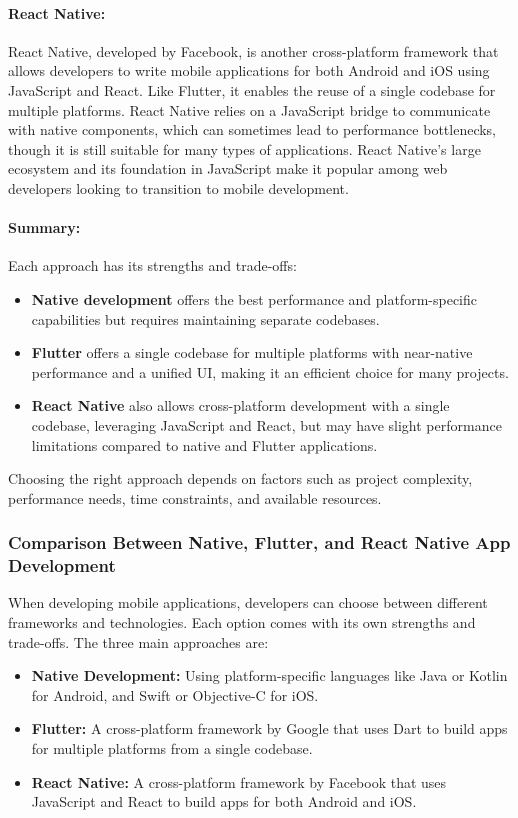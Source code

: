 \documentclass[12pt,a4paper]{report}
\begin{document}
\paragraph{React Native:}
React Native, developed by Facebook, is another cross-platform framework that allows developers to write mobile applications for both Android and iOS using JavaScript and React. Like Flutter, it enables the reuse of a single codebase for multiple platforms. React Native relies on a JavaScript bridge to communicate with native components, which can sometimes lead to performance bottlenecks, though it is still suitable for many types of applications. React Native’s large ecosystem and its foundation in JavaScript make it popular among web developers looking to transition to mobile development.

\paragraph{Summary:}
Each approach has its strengths and trade-offs:
\begin{itemize}
    \item \textbf{Native development} offers the best performance and platform-specific capabilities but requires maintaining separate codebases.
    \item \textbf{Flutter} offers a single codebase for multiple platforms with near-native performance and a unified UI, making it an efficient choice for many projects.
    \item \textbf{React Native} also allows cross-platform development with a single codebase, leveraging JavaScript and React, but may have slight performance limitations compared to native and Flutter applications.
\end{itemize}

Choosing the right approach depends on factors such as project complexity, performance needs, time constraints, and available resources.


\subsubsection{Comparison Between Native, Flutter, and React Native App Development}

When developing mobile applications, developers can choose between different frameworks and technologies. Each option comes with its own strengths and trade-offs. The three main approaches are:

\begin{itemize}
    \item \textbf{Native Development:} Using platform-specific languages like Java or Kotlin for Android, and Swift or Objective-C for iOS.
    \item \textbf{Flutter:} A cross-platform framework by Google that uses Dart to build apps for multiple platforms from a single codebase.
    \item \textbf{React Native:} A cross-platform framework by Facebook that uses JavaScript and React to build apps for both Android and iOS.
\end{itemize}
\end{document}
